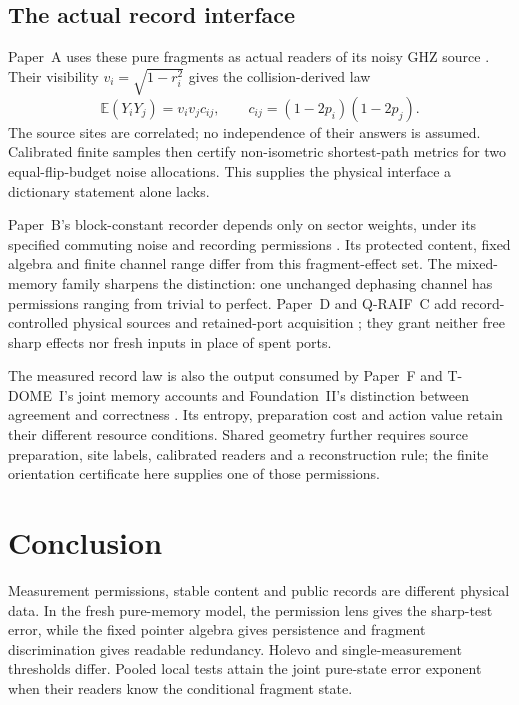 \documentclass[12pt,a4paper]{article}
\begin{document}
\subsection{The actual record interface}
\label{sec:connection}

Paper~A uses these pure fragments as actual readers of its noisy GHZ
source \cite{Liu2026PaperA}. Their visibility
$v_i=\sqrt{1-r_i^2}$ gives the collision-derived law
\[
 \mathbb E(Y_iY_j)=v_iv_jc_{ij},\qquad
 c_{ij}=(1-2p_i)(1-2p_j).
\]
The source sites are correlated; no independence of their answers is
assumed. Calibrated finite samples then certify non-isometric
shortest-path metrics for two equal-flip-budget noise allocations.
This supplies the physical interface a dictionary statement alone lacks.

Paper~B's block-constant recorder depends only on sector weights,
under its specified commuting noise and recording permissions
\cite{Liu2026PaperB}. Its protected content, fixed algebra and finite
channel range differ from this fragment-effect set. The mixed-memory
family sharpens the distinction: one unchanged dephasing channel has
permissions ranging from trivial to perfect. Paper~D and Q-RAIF~C add
record-controlled physical sources and retained-port acquisition
\cite{Liu2026PaperD,Liu2026QRAIFC}; they grant neither free sharp
effects nor fresh inputs in place of spent ports.

The measured record law is also the output consumed by Paper~F and
T-DOME~I's joint memory accounts and Foundation~II's distinction between
agreement and correctness \cite{Liu2026PaperF,Liu2026TDOME_I,FoundationII}.
Its entropy, preparation cost and action value retain their different
resource conditions. Shared geometry further requires source preparation,
site labels, calibrated readers and a reconstruction rule; the finite
orientation certificate here supplies one of those permissions.

\section{Conclusion}
\label{sec:conclusion}

Measurement permissions, stable content and public records are
different physical data. In the fresh pure-memory model, the
permission lens gives the sharp-test error, while the fixed
pointer algebra gives persistence and fragment discrimination
gives readable redundancy. Holevo and single-measurement
thresholds differ. Pooled local tests attain the joint
pure-state error exponent when their readers know the
conditional fragment state.
\end{document}
